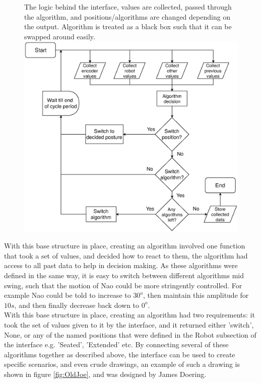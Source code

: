 \documentclass[11pt]{article}
\begin{document}
    \begin{figure}[!htb]
        \centering
        \captionbox
             {The logic behind the interface, values are collected, passed through the algorithm, and positions/algorithms are changed depending on the output. Algorithm is treated as a black box such that it can be swapped around easily.\label{fig:InterfaceLogic}}
             {\includegraphics[width=1.0\textwidth]{InterfaceLogic.eps}}
    \end{figure}

With this base structure in place, creating an algorithm involved one function that took a set of values, and decided how to react to them, the algorithm had access to all past data to help in decision making. As these algorithms were defined in the same way, it is easy to switch between different algorithms mid swing, such that the motion of Nao could be more stringently controlled. For example Nao could be told to increase to $30^o$, then maintain this amplitude for $10s$, and then finally decrease back down to $0^o$.\\

With this base structure in place, creating an algorithm had two requirements: it took the set of values given to it by the interface, and it returned either 'switch', None, or any of the named positions that were defined in the Robot subsection of the interface e.g. 'Seated', 'Extended' etc. By connecting several of these algorithms together as described above, the interface can be used to create specific scenarios, and even crude drawings, an example of such a drawing is shown in figure \ref{fig:OldJoe}, and was designed by James Doering.
\end{document}

